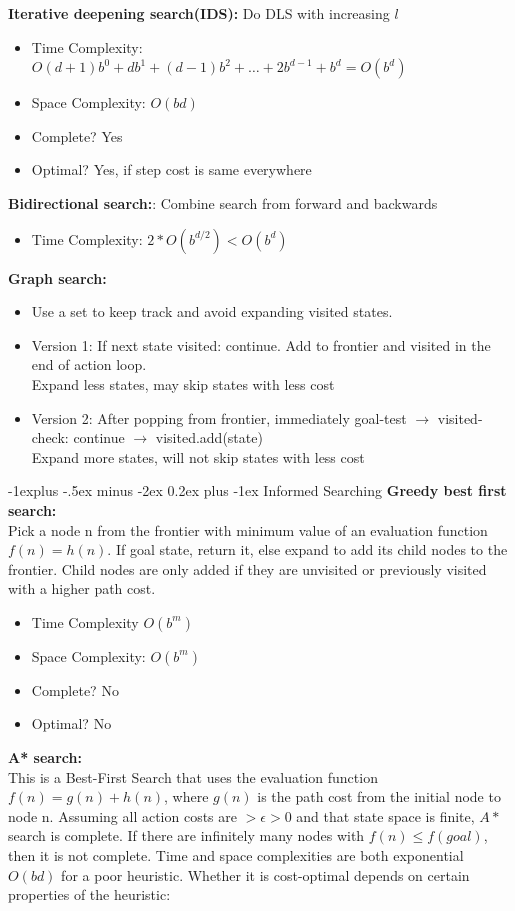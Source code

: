 \documentclass[10pt,landscape]{article}
\makeatletter
\renewcommand{\subsection}{\@startsection{subsection}{2}{0mm}%
                                {-1explus -.5ex minus -2ex}%
                                {0.2ex plus -1ex}%
                                {\normalfont\small\bfseries}}
\makeatother
\begin{document}
\begin{multicols}{3}
\begin{scriptsize}
\textbf{Iterative deepening search(IDS):} Do DLS with increasing $l$
\begin{itemize}
  \item Time Complexity: $O(d+1)b^0 + db^1 + (d-1)b^2 + \ldots + 2b^{d-1} + b^d = O(b^d)$
  \item Space Complexity: $O(bd)$
  \item Complete? Yes
  \item Optimal? Yes, if step cost is same everywhere
\end{itemize}
\textbf{Bidirectional search:}: Combine search from forward and backwards
\begin{itemize}
  \item Time Complexity: $ 2 * O(b^{d/2}) < O(b^d)$
\end{itemize}
\textbf{Graph search:}
\begin{itemize}
  \item Use a set to keep track and avoid expanding visited states.
  \item Version 1: If next state visited: continue. Add to frontier and visited in the end of action loop.
  \\ Expand less states, may skip states with less cost
  \item Version 2: After popping from frontier, immediately goal-test $\rightarrow$ visited-check: continue $\rightarrow$ visited.add(state)
  \\ Expand more states, will not skip states with less cost
\end{itemize}

\subsection{Informed Searching}
\textbf{Greedy best first search:}\\
Pick a node n from the frontier with minimum value of an
 evaluation function $f(n) = h(n)$. If goal state, return it, else expand to add its child nodes to the frontier. Child nodes are
 only added if they are unvisited or previously visited with
 a higher path cost.
 \begin{itemize}
  \item Time Complexity $O(b^m)$
  \item Space Complexity: $O(b^m)$
  \item Complete? No
  \item Optimal? No
\end{itemize}

\textbf{A* search:}\\
This is a Best-First Search that uses the evaluation function $f(n) = g(n) + h(n)$, where $g(n)$ is the path cost from
 the initial node to node n.
 Assuming all action costs are $> \epsilon> 0$ and that state space
 is finite, $A*$ search is complete. If there are infinitely many
 nodes with $f(n) \leq f(goal)$, then it is not complete. Time
 and space complexities are both exponential \textbf{$O(bd)$} for a
 poor heuristic. Whether it is cost-optimal depends on certain properties of the heuristic:
 

\end{scriptsize}
\end{multicols}
\end{document}
